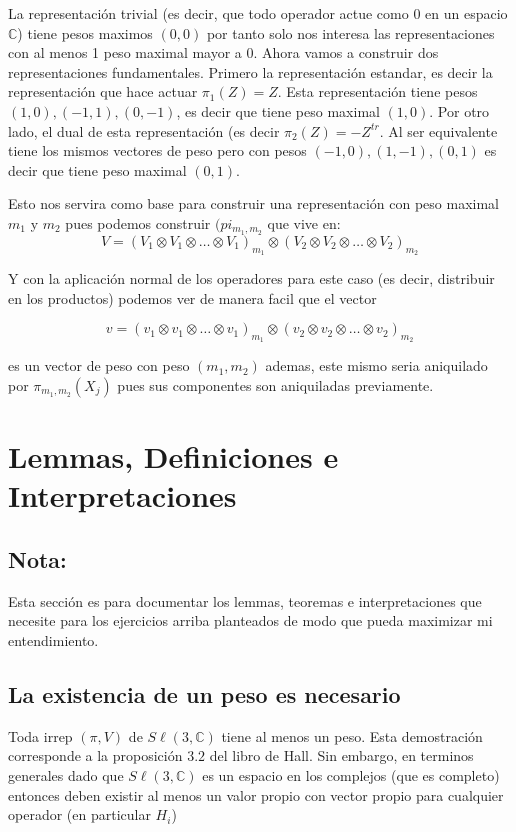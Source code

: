 \documentclass[12pt]{exam}
\begin{document}
La representación trivial (es decir, que todo operador actue como $0$ en un espacio $\mathbb{C}$) tiene pesos maximos $(0, 0)$ por tanto solo nos interesa las representaciones con al menos 1 peso maximal mayor a $0$. Ahora vamos a construir dos representaciones fundamentales. Primero la representación estandar, es decir la representación que hace actuar $\pi_1(Z) = Z$. Esta representación tiene pesos $(1, 0), (-1, 1), (0, -1)$, es decir que tiene peso maximal $(1, 0)$. Por otro lado, el dual de esta representación (es decir $\pi_2(Z) = - Z^{tr}$. Al ser equivalente tiene los mismos vectores de peso pero con pesos $(-1, 0), (1, -1), (0, 1)$ es decir que tiene peso maximal $(0, 1)$.

Esto nos servira como base para construir una representación con peso maximal $m_1$ y $m_2$ pues podemos construir $(pi_{m_1, m_2}$ que vive en:
\[
  V = (V_1\otimes V_1 \otimes \ldots \otimes V_1)_{m_1} \otimes (V_2 \otimes V_2 \otimes \ldots \otimes V_2)_{m_2}
\]

Y con la aplicación normal de los operadores para este caso (es decir, distribuir en los productos) podemos ver de manera facil que el vector 

\[
  v = (v_1\otimes v_1 \otimes \ldots \otimes v_1)_{m_1} \otimes (v_2 \otimes v_2 \otimes \ldots \otimes v_2)_{m_2}
\]

es un vector de peso con peso $(m_1, m_2)$ ademas, este mismo seria aniquilado por $\pi_{m_1, m_2}(X_j)$ pues sus componentes son aniquiladas previamente.



\section{Lemmas, Definiciones e Interpretaciones}
\subsection*{Nota:}

Esta sección es para documentar los lemmas, teoremas e interpretaciones que necesite para los ejercicios arriba planteados de modo que pueda maximizar mi entendimiento.

\subsection{La existencia de un peso es necesario}\label{sec:prop_6_2}

Toda irrep $(\pi, V)$ de $S\ell(3, \mathbb{C})$ tiene al menos un peso. Esta demostración corresponde a la proposición $3.2$ del libro de Hall. Sin embargo, en terminos generales dado que $S\ell(3, \mathbb{C})$ es un espacio en los complejos (que es completo)  entonces deben existir al menos un valor propio con vector propio para cualquier operador (en particular $H_i$)
\end{document}
